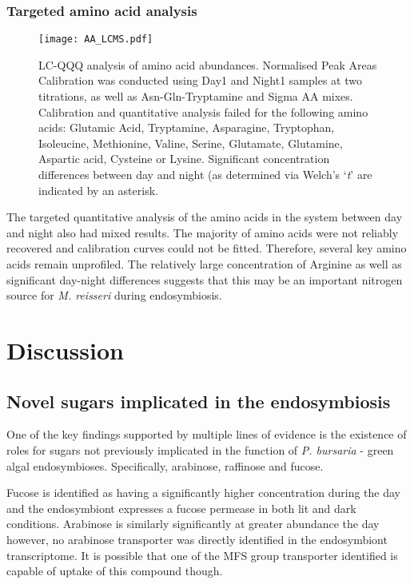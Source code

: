\subsubsection{Targeted amino acid analysis}

\begin{figure}
    \texttt{[image: AA\_LCMS.pdf]}
    \caption[LC-QQQ Quantitative Analysis of Amino Acids]{LC-QQQ analysis
        of amino acid abundances. Normalised Peak Areas 
        Calibration was conducted using Day1 and Night1 samples at two titrations, as well as Asn-Gln-Tryptamine and Sigma AA mixes.
    Calibration and quantitative analysis failed for the following amino acids: 
Glutamic Acid, Tryptamine, Asparagine, Tryptophan, Isoleucine, Methionine, Valine, Serine, Glutamate, Glutamine, Aspartic acid, Cysteine or Lysine.
Significant concentration differences between day and night (as determined via Welch's `\textit{t}' are indicated by an asterisk.}
    \label{fig:amino_acids}
\end{figure}

The targeted quantitative analysis of the amino acids in the system
between day and night also had mixed results.  The majority of amino
acids were not reliably recovered and calibration curves could not be fitted.
Therefore, several key amino acids remain unprofiled.
The relatively large concentration of Arginine as well as significant
day-night differences suggests that this may be an important nitrogen
source for \textit{M. reisseri} during endosymbiosis.


\section{Discussion}

\subsection{Novel sugars implicated in the endosymbiosis}

One of the key findings supported by multiple lines of evidence
is the existence of roles for sugars not previously implicated in the
function of \textit{P. bursaria} - green algal endosymbioses. 
Specifically, arabinose, raffinose and fucose. 

Fucose is identified as having a significantly higher concentration during the day 
and the endosymbiont expresses a fucose permease in both lit and dark conditions.
Arabinose is similarly significantly at greater abundance the day 
however, no arabinose transporter was directly identified in the endosymbiont 
transcriptome.  It is possible that one of the MFS group transporter identified is 
capable of uptake of this compound though. 

